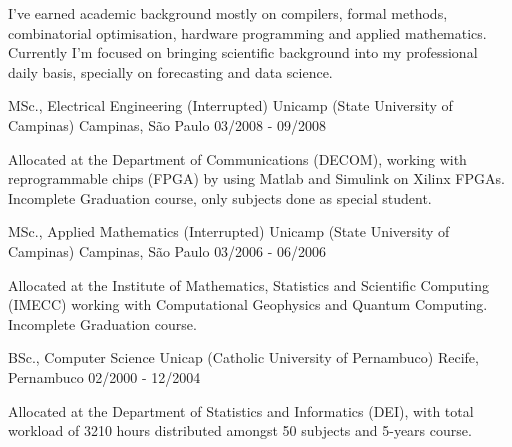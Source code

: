 
\begin{cvparagraph}
I've earned academic background mostly on compilers, formal methods, combinatorial optimisation, hardware programming and applied mathematics. Currently I'm focused on bringing scientific background into my professional daily basis, specially on forecasting and data science.
\end{cvparagraph}


\begin{cventries}

\cventry
    {MSc., Electrical Engineering (Interrupted)} %
    {Unicamp (State University of Campinas)} %
    {Campinas, São Paulo} %
    {03/2008 - 09/2008} %
    {
      \begin{cvitems} %
        \item Allocated at the Department of Communications (DECOM), working with reprogrammable chips (FPGA) by using Matlab and Simulink on Xilinx FPGAs. Incomplete Graduation course, only subjects done as special student.
      \end{cvitems}
    }

\cventry
        {MSc., Applied Mathematics (Interrupted)}
        {Unicamp (State University of Campinas)}
        {Campinas, São Paulo}
        {03/2006 - 06/2006}
        {
         \begin{cvitems}
           \item {Allocated at the Institute of Mathematics, Statistics and Scientific Computing (IMECC) working with Computational Geophysics and Quantum Computing. Incomplete Graduation course.}
          \end{cvitems}
        }

\cventry
        {BSc., Computer Science}
        {Unicap (Catholic University of Pernambuco)}
        {Recife, Pernambuco}
        {02/2000 - 12/2004}
        {
        \begin{cvitems}
                \item Allocated at the Department of Statistics and Informatics (DEI), with total workload of 3210 hours distributed amongst 50 subjects and 5-years course.
        \end{cvitems}
        }

\end{cventries}

